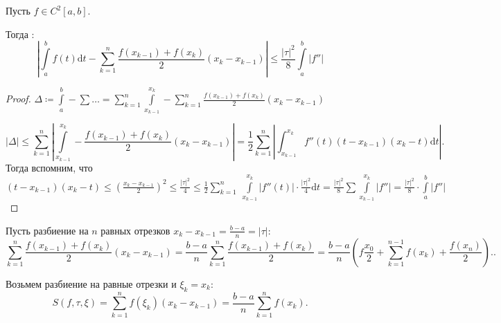 \begin{theorem}
    Пусть $f \in C^2[a, b]$.

    Тогда : \[\left|\int\limits_a^b f(t) \mathrm{d}t - \sum_{k=1}^n \frac{f(x_{k-1}) + f(x_k)}{2}(x_k - x_{k-1})\right| \le \frac{|\tau|^2}{8} \int\limits_a^b |f''|\]
\end{theorem}
\begin{proof}
    $\Delta \coloneqq \int\limits_a^b - \sum \ldots = \sum\limits_{k=1}^n \int\limits_{x_{k-1}}^{x_k} - \sum\limits_{k=1}^n \frac{f(x_{k-1}) + f(x_k)}{2}(x_k - x_{k-1})$

    \[
        |\Delta| \le  \sum\limits_{k=1}^n |\int\limits_{x_{k-1}}^{x_k} - \frac{f(x_{k-1}) + f(x_k)}{2}(x_k - x_{k-1})| = \frac{1}{2} \sum\limits_{k=1}^n \left| \int_{x_{k-1}}^{x_k} f''(t)(t-x_{k-1})(x_k - t)\mathrm{d}t\right|
    .\] Тогда вспомним, что $(t-x_{k-1})(x_k - t) \le \left( \frac{x_k - x_{k-1}}{2}\right)^2 \le \frac{|\tau|^2}{4} \le \frac{1}{2} \sum\limits_{k=1}^n\ \int\limits_{x_{k-1}}^{x_k}|f''(t)| \cdot \frac{|\tau|^2}{4} \mathrm{d}t = \frac{|\tau|^2}{8} \sum \int\limits_{x_{k-1}}^{x_k} |f''| = \frac{|\tau|^2}{8} \cdot \int\limits_a^b |f''|$
\end{proof}
\begin{remark}
    Пусть разбиение на $n$ равных отрезков  $x_k - x_{k-1} = \frac{b-a}{n} = |\tau|$:
    \[
        \sum_{k=1}^n \frac{f(x_{k-1}) + f(x_k)}{2}(x_k - x_{k-1}) = \frac{b-a}{n} \sum_{k=1}^n \frac{f(x_{k-1}) + f(x_k)}{2} = \frac{b-a}{n}(f\frac{x_0}{2} + \sum_{k=1}^{n-1}f(x_k) + \frac{f(x_n)}{2}).
    .\] 
\end{remark}
\begin{remark}
    Возьмем разбиение на равные отрезки и $\xi_k = x_k$:
     \[
         S(f, \tau, \xi) = \sum_{k=1}^n f(\xi_k)(x_k - x_{k-1}) = \frac{b-a}{n} \sum_{k=1}^n f(x_k)
    .\] 
\end{remark}
